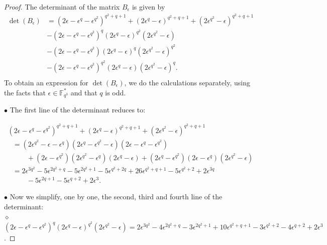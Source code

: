 \documentclass[12pt]{amsart}
\def\e{\epsilon}
\def\e{\epsilon}
\begin{document}
\begin{proof}
	The determinant of the matrix $
	B_{\e}$  is given by
	$$
	\begin{array}{rl}
		\det(B_{\e}) &= (2 \epsilon - \epsilon^q - \epsilon^{q^2})^{q^2 + q + 1} + (2\epsilon^q -\epsilon)^{q^2 + q +1} + (2\epsilon^{q^2} - \epsilon)^{q^2 + q + 1}\\
		& - (2 \epsilon - \epsilon^q - \epsilon^{q^2})^q (2\epsilon^q -\epsilon)^{q^2} (2\epsilon^{q^2} - \epsilon)\\
		& - (2 \epsilon - \epsilon^q - \epsilon^{q^2}) (2\epsilon^q -\epsilon)^{q} (2\epsilon^{q^2} - \epsilon)^{q^2}\\
		& - (2 \epsilon - \epsilon^q - \epsilon^{q^2})^{q^2} (2\epsilon^q -\epsilon) (2\epsilon^{q^2} - \epsilon)^q .\\
	\end{array}
	$$
	To obtain an expression for $\det(B_{\e})$, we do the calculations separately, using the facts that $\epsilon \in \mathbb{F}_{q^3}^{\ast}$ and that $q$ is odd.
	
	$\bullet$ The first line of the determinant reduces to:
	
	$$\begin{array}{l}
		(2 \epsilon - \epsilon^q - \epsilon^{q^2})^{q^2 + q + 1} + (2\epsilon^q -\epsilon)^{q^2 + q +1} + (2\epsilon^{q^2} - \epsilon)^{q^2 + q + 1}\\
		\mbox{ }= (2 \epsilon^{q^2} - \epsilon - \epsilon^{q}) (2 \epsilon^q - \epsilon^{q^2} - \epsilon) (2 \epsilon - \epsilon^q - \epsilon^{q^2})\\
		\mbox{ } \mbox{ } \mbox{ } \mbox{ } + (2\epsilon -\epsilon^{q^2})(2\epsilon^{q^2} -\epsilon^q)(2\epsilon^q -\epsilon) + (2\epsilon^{q} - \epsilon^{q^2}) (2\epsilon - \epsilon^q)(2\epsilon^{q^2} - \epsilon)\\
		\mbox{ } = 2\e^{3 q^2} -5\e^{2q^2 + q} -5 \e^{2q^2 + 1} - 5\e^{q^2 + 2q} + 26\e^{q^2 + q + 1} - 5 \e^{q^2+2} + 2\e^{3q}\\
		\mbox{ } \mbox{ } \mbox{ } \mbox{ }  - 5\e^{2q+1} - 5 \e^{q+2} +2\e^3.
	\end{array}$$
	
	\bigskip
	
	$\bullet$ Now we simplify, one by one,  the second, third and fourth line of the determinant:\\
	
	$\diamond$ $(2 \epsilon - \epsilon^q - \epsilon^{q^2})^q (2\epsilon^q -\epsilon)^{q^2} (2\epsilon^{q^2} - \epsilon) = 2\e^{3q^2} - 4 \e^{2q^2 + q} - 3 \e^{2q^2 + 1} + 10 \e^{q^2 + q + 1} - 3\e^{q^2 + 2} -4\e^{q + 2} + 2 \e^{3}$.
	

\end{proof}
\end{document}
